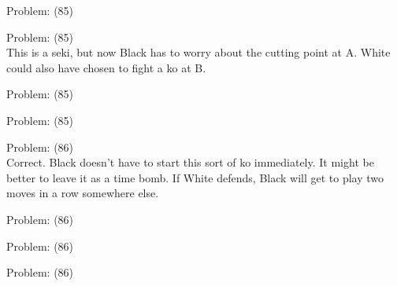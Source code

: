 \documentclass[11pt]{article}
\begin{document}
\begin{minipage}[t]{0.5\textwidth}
  {\centering
  
Problem: (85)\\
  }
\end{minipage}
\begin{minipage}[t]{0.5\textwidth}
  {\centering
  
Problem: (85)\\
This is a seki, but now Black has to worry about the cutting point at A. White could also have chosen to fight a ko at B.\\
  }
\end{minipage}
\begin{minipage}[t]{0.5\textwidth}
  {\centering
  
Problem: (85)\\
  }
\end{minipage}
\begin{minipage}[t]{0.5\textwidth}
  {\centering
  
Problem: (85)\\
  }
\end{minipage}
\begin{minipage}[t]{0.5\textwidth}
  {\centering
  
Problem: (86)\\
Correct. Black doesn't have to start this sort of ko immediately. It might be better to leave it as a time bomb. If White defends, Black will get to play two moves in a row somewhere else.\\
  }
\end{minipage}
\begin{minipage}[t]{0.5\textwidth}
  {\centering
  
Problem: (86)\\
  }
\end{minipage}
\begin{minipage}[t]{0.5\textwidth}
  {\centering
  
Problem: (86)\\
  }
\end{minipage}
\begin{minipage}[t]{0.5\textwidth}
  {\centering
  
Problem: (86)\\
  }
\end{minipage}
\end{document}
